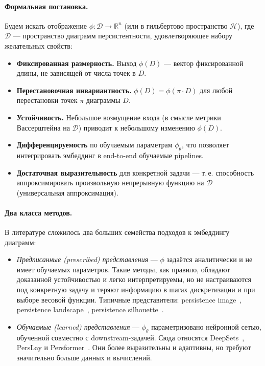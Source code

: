 \paragraph{Формальная постановка.}
Будем искать отображение $\phi: \mathcal{D} \to \mathbb{R}^n$ (или в гильбертово пространство $\mathcal{H}$), где $\mathcal{D}$ --- пространство диаграмм персистентности, удовлетворяющее набору желательных свойств:
\begin{itemize}
\item[(i)] \textbf{Фиксированная размерность.} Выход $\phi(D)$ --- вектор фиксированной длины, не зависящей от числа точек в $D$.
\item[(ii)] \textbf{Перестановочная инвариантность.} $\phi(D) = \phi(\pi \cdot D)$ для любой перестановки точек $\pi$ диаграммы $D$.
\item[(iii)] \textbf{Устойчивость.} Небольшое возмущение входа (в смысле метрики Вассерштейна на $\mathcal{D}$) приводит к небольшому изменению $\phi(D)$.
\item[(iv)] \textbf{Дифференцируемость} по обучаемым параметрам $\phi_\theta$, что позволяет интегрировать эмбеддинг в end-to-end обучаемые pipelines.
\item[(v)] \textbf{Достаточная выразительность} для конкретной задачи --- т.\,е. способность аппроксимировать произвольную непрерывную функцию на $\mathcal{D}$ (универсальная аппроксимация).
\end{itemize}

\paragraph{Два класса методов.}
В литературе сложилось два больших семейства подходов к эмбеддингу диаграмм:
\begin{itemize}
\item \emph{Предписанные (prescribed) представления} --- $\phi$ задаётся аналитически и не имеет обучаемых параметров. Такие методы, как правило, обладают доказанной устойчивостью и легко интерпретируемы, но не настраиваются под конкретную задачу и теряют информацию в шагах дискретизации и при выборе весовой функции. Типичные представители: persistence image~\cite{adamsPersistenceImages2017}, persistence landscape~\cite{bubenikStatisticalTopologicalData2015}, persistence silhouette~\cite{chazalStochasticConvergencePersistence2014}.
\item \emph{Обучаемые (learned) представления} --- $\phi_\theta$ параметризовано нейронной сетью, обученной совместно с downstream-задачей. Сюда относятся DeepSets~\cite{zaheerDeepSets2017}, PersLay и Persformer~\cite{reinauerPersformerTransformerArchitecture2021}. Они более выразительны и адаптивны, но требуют значительно больше данных и вычислений.
\end{itemize}

